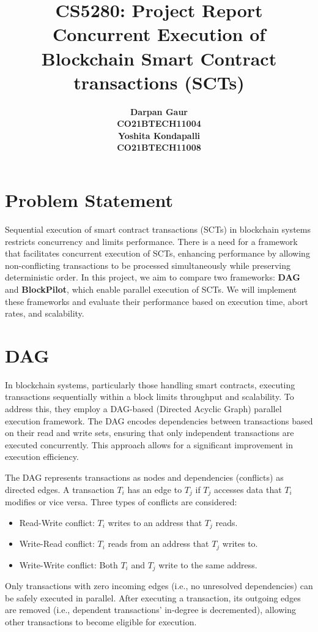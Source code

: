 \documentclass[12pt]{article}
\title{
    \textbf{CS5280: Project Report} \\
    \textbf{Concurrent Execution of Blockchain Smart Contract transactions (SCTs)} \\ 
}
\author{
    \begin{tabular}{c}
        \textbf{Darpan Gaur} \\
        \textbf{CO21BTECH11004}
    \end{tabular}
    \begin{tabular}{c}
        \textbf{Yoshita Kondapalli} \\
        \textbf{CO21BTECH11008}
    \end{tabular}
}
\date{}
\begin{document}
\maketitle

\hrulefill

\section{Problem Statement}
Sequential execution of smart contract transactions (SCTs) in blockchain systems restricts concurrency and limits performance.
There is a need for a framework that facilitates concurrent execution of SCTs, enhancing performance by allowing non-conflicting transactions to be processed simultaneously while preserving deterministic order.
In this project, we aim to compare two frameworks: \textbf{DAG} and \textbf{BlockPilot}, which enable parallel execution of SCTs. We will implement these frameworks and evaluate their performance based on execution time, abort rates, and scalability.

\section{DAG}

In blockchain systems, particularly those handling smart contracts, executing transactions sequentially within a block limits throughput and scalability. To address this, they employ a DAG-based (Directed Acyclic Graph) parallel execution framework. The DAG encodes dependencies between transactions based on their read and write sets, ensuring that only independent transactions are executed concurrently. This approach allows for a significant improvement in execution efficiency.

The DAG represents transactions as nodes and dependencies (conflicts) as directed edges. A transaction $T_i$ has an edge to $T_j$ if $T_j$ accesses data that $T_i$ modifies or vice versa. Three types of conflicts are considered:
\begin{itemize}
    \item Read-Write conflict: $T_i$ writes to an address that $T_j$ reads.
    \item Write-Read conflict: $T_i$ reads from an address that $T_j$ writes to.
    \item Write-Write conflict: Both $T_i$ and $T_j$ write to the same address.
\end{itemize}

Only transactions with zero incoming edges (i.e., no unresolved dependencies) can be safely executed in parallel. After executing a transaction, its outgoing edges are removed (i.e., dependent transactions' in-degree is decremented), allowing other transactions to become eligible for execution.
\end{document}

